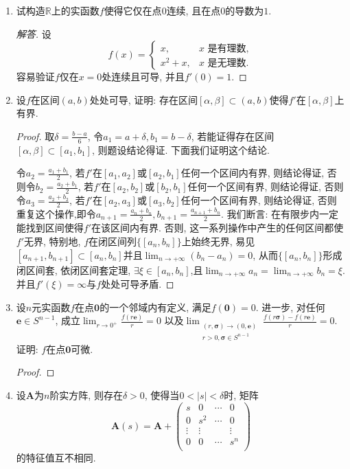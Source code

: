 \begin{1b}
\begin{enumerate}
\item 试构造\(\mathbb{R}\)上的实函数\(f\)使得它仅在点\(0\)连续, 且在点\(0\)的导数为\(1\).
\begin{proof}[解答]
设\[f(x)=\begin{cases}
x,\quad &x\text{ 是有理数},\\
x^2+x,&x\text{ 是无理数}.
\end{cases}\]容易验证\(f\)仅在\(x=0\)处连续且可导, 并且\(f'(0)=1\).
\end{proof}
\item 设\(f\)在区间\((a,b)\)处处可导, 证明: 
存在区间\([\alpha,\beta]\subset (a,b)\)使得\(f'\)在\([\alpha,\beta]\)上有界.
\begin{proof}
取\(\delta=\frac{b-a}{6}\), 令\(a_1=a+\delta,b_1=b-\delta\), 
若能证得存在区间\([\alpha,\beta]\subset[a_1,b_1]\), 则题设结论得证. 下面我们证明这个结论.

令\(a_2=\frac{a_1+b_1}{2}\), 
若\(f'\)在\([a_1,a_2]\)或\([a_2,b_1]\)任何一个区间内有界, 则结论得证, 
否则令\(b_2=\frac{a_2+b_1}{2}\), 若\(f'\)在\([a_2,b_2]\)或\([b_2,b_1]\)任何一个区间有界, 则结论得证, 
否则令\(a_3=\frac{a_2+b_2}{2}\), 若\(f'\)在\([a_2,a_3]\)或\([a_3,b_2]\)任何一个区间有界, 则结论得证, 
否则重复这个操作,即令\(a_{n+1}=\frac{a_n+b_n}{2},b_{n+1}=\frac{a_{n+1}+b_n}{2}\). 
我们断言: 在有限步内一定能找到区间使得\(f'\)在该区间内有界. 
否则, 这一系列操作中产生的任何区间都使\(f'\)无界, 
特别地, \(f\)在闭区间列\(\{[a_n,b_n]\}\)上始终无界, 
易见\([a_{n+1},b_{n+1}]\subset [a_n,b_n]\)并且\(\lim_{n\rightarrow+\infty}\left(b_n-a_n\right)=0\), 从而\(\{[a_n,b_n]\}\)形成闭区间套, 依闭区间套定理, \(\exists\xi\in[a_n,b_n]\),且\(\lim_{n\rightarrow+\infty}a_n=\lim_{n\rightarrow+\infty}b_n=\xi\).  并且\(f'(\xi)=\infty\)与\(f\)处处可导矛盾.
\end{proof}
\item 设\(n\)元实函数\(f\)在点\(\boldsymbol{0}\)的一个邻域内有定义, 
满足\(f(\boldsymbol{0})=0\). 
进一步, 对任何\(\boldsymbol{e}\in S^{n-1}\), 
成立\(\lim_{r\rightarrow 0^+}\frac{f(r\boldsymbol{e})}{r}=0\)
以及\(\lim_{\substack{(r,\boldsymbol{\sigma})\rightarrow (0,\boldsymbol{e})\\ r>0,\boldsymbol{\sigma}\in S^{n-1}}}\frac{f(r\boldsymbol{\sigma})-f(r\boldsymbol{e})}{r}=0\). 
证明: \(f\)在点\(\boldsymbol{0}\)可微.
\begin{proof}
	
\end{proof}
\item 设\(\boldsymbol{A}\)为\(n\)阶实方阵, 
则存在\(\delta>0\), 使得当\(0<|s|<\delta\)时, 矩阵
\[\boldsymbol{A}(s)=\boldsymbol{A}+\left(\begin{matrix}
    s&0&\cdots&0\\0&s^2&\cdots&0\\\vdots&\vdots&&\vdots\\0&0&\cdots&s^n\\
\end{matrix}\right)\]的特征值互不相同.


\end{enumerate}
\end{1b}
